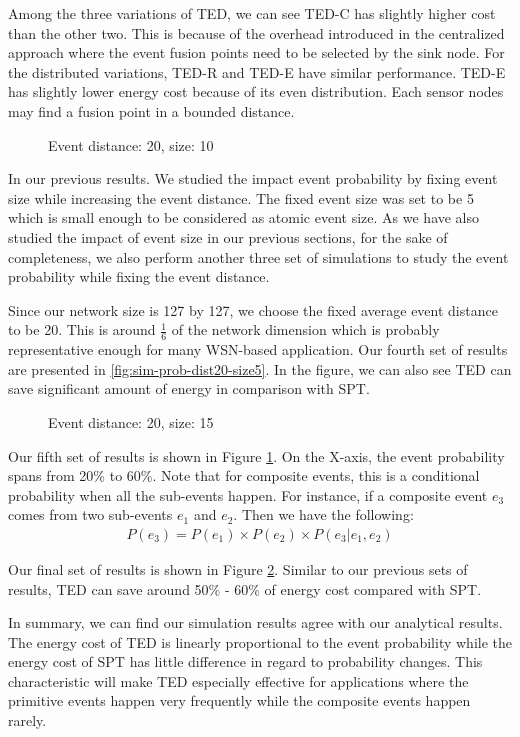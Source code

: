 Among the three variations of TED, we can see TED-C has slightly higher cost than the other two. This is because of the overhead introduced in the centralized approach where the event fusion points need to be selected by the sink node. For the distributed variations, TED-R and TED-E have similar performance. TED-E has slightly lower energy cost because of its even distribution. Each sensor nodes may find a fusion point in a bounded distance.

\begin{figure}
\centering
{}
\caption{Event distance: 20, size: 10}
\label{fig:sim-prob-dist20-size10}
\end{figure}

In our previous results. We studied the impact event probability by fixing event size while increasing the event distance. The fixed event size was set to be 5 which is small enough to be considered as atomic event size. As we have also studied the impact of event size in our previous sections, for the sake of completeness, we also perform another three set of simulations to study the event probability while fixing the event distance.

Since our network size is 127 by 127, we choose the fixed average event distance to be 20. This is around \(\frac{1}{6}\) of the network dimension which is probably representative enough for many WSN-based application. Our fourth set of results are presented in \ref{fig:sim-prob-dist20-size5}. In the figure, we can also see TED can save significant amount of energy in comparison with SPT.

\begin{figure}
\centering
{}
\caption{Event distance: 20, size: 15}
\label{fig:sim-prob-dist20-size15}
\end{figure}

Our fifth set of results is shown in Figure \ref{fig:sim-prob-dist20-size10}. On the X-axis, the event probability spans from 20\% to 60\%. Note that for composite events, this is a conditional probability when all the sub-events happen. For instance, if a composite event \(e_3\) comes from two sub-events \(e_1\) and \(e_2\). Then we have the following:
\begin{align*}
P(e_3) = P(e_1) \times P(e_2) \times P(e_3|e_1, e_2)
\end{align*}

Our final set of results is shown in Figure \ref{fig:sim-prob-dist20-size15}. Similar to our previous sets of results, TED can save around 50\% - 60\% of energy cost compared with SPT.

In summary, we can find our simulation results agree with our analytical results. The energy cost of TED is linearly proportional to the event probability while the energy cost of SPT has little difference in regard to probability changes. This characteristic will make TED especially effective for applications where the primitive events happen very frequently while the composite events happen rarely.